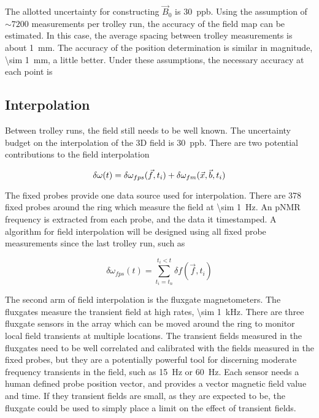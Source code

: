 The allotted uncertainty for constructing $\vec{B}_0$ is \SI{30}{ppb}.  Using the assumption of $\sim 7200$ measurements per trolley run, the accuracy of the field map can be estimated.  In this case, the average spacing between trolley measurements is about \SI{1}{mm}.  The accuracy of the position determination is similar in magnitude, \SI{\sim 1}{mm}, a little better.  Under these assumptions, the necessary accuracy at each point is 


\subsection{Interpolation}

Between trolley runs, the field still needs to be well known.  The uncertainty budget on the interpolation of the 3D field is \SI{30}{ppb}.  There are two potential contributions to the field interpolation

\begin{equation}
\label{eqn:field-interpolation}
\delta \omega(t) = \delta \omega_{fps}(\vec{f}, t_i) \\
+ \delta \omega_{fm}(\vec{x}, \vec{b}, t_i)
\end{equation}

The fixed probes provide one data source used for interpolation.  There are 378 fixed probes around the ring which measure the field at \SI{\sim 1}{\Hz}.  An pNMR frequency is extracted from each probe, and the data it timestamped.  A algorithm for field interpolation will be designed using all fixed probe measurements since the last trolley run, such as

\begin{equation}
\label{eqn:field-interpolation-fps}
\delta \omega_{fps}(t) = \sum_{t_i = t_n}^{t_i < t} \delta f(\vec{f}, t_i)
\end{equation}

The second arm of field interpolation is the fluxgate magnetometers.  The fluxgates measure the transient field at high rates, \SI{\sim 1}{\kHz}.  There are three fluxgate sensors in the array which can be moved around the ring to monitor local field transients at multiple locations.  The transient fields measured in the fluxgates need to be well correlated and calibrated with the fields measured in the fixed probes, but they are a potentially powerful tool for discerning moderate frequency transients in the field, such as \SI{15}{\Hz} or \SI{60}{\Hz}.  Each sensor needs a human defined probe position vector, and provides a vector magnetic field value and time.  If they transient fields are small, as they are expected to be, the fluxgate could be used to simply place a limit on the effect of transient fields.

